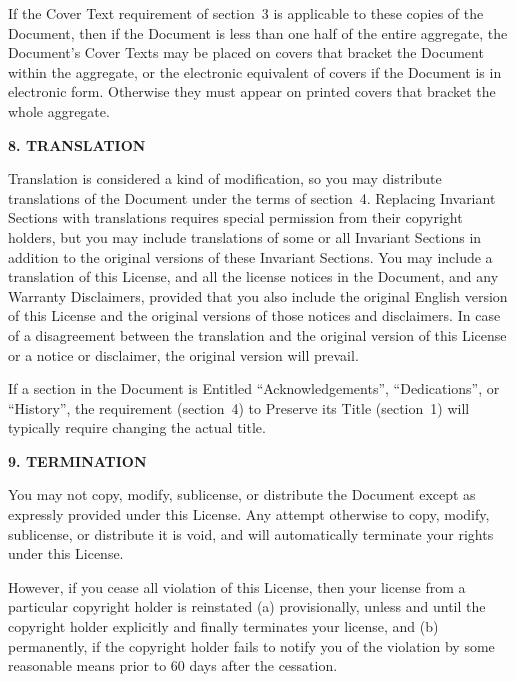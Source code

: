\documentclass[10pt,a4paper,ngerman,titlepage,tocindentauto]{article}
\begin{document}
\begin{multicols}{3}
{				If the Cover Text requirement of section~3 is applicable to these
				copies of the Document, then if the Document is less than one half of
				the entire aggregate, the Document's Cover Texts may be placed on
				covers that bracket the Document within the aggregate, or the
				electronic equivalent of covers if the Document is in electronic form.
				Otherwise they must appear on printed covers that bracket the whole
				aggregate.


				\begin{center}
				{\bf 8. TRANSLATION\par}
				\end{center}

				Translation is considered a kind of modification, so you may
				distribute translations of the Document under the terms of section~4.
				Replacing Invariant Sections with translations requires special
				permission from their copyright holders, but you may include
				translations of some or all Invariant Sections in addition to the
				original versions of these Invariant Sections.  You may include a
				translation of this License, and all the license notices in the
				Document, and any Warranty Disclaimers, provided that you also include
				the original English version of this License and the original versions
				of those notices and disclaimers.  In case of a disagreement between
				the translation and the original version of this License or a notice
				or disclaimer, the original version will prevail.

				If a section in the Document is Entitled ``Acknowledgements'',
				``Dedications'', or ``History'', the requirement (section~4) to Preserve
				its Title (section~1) will typically require changing the actual
				title.


				\begin{center}
				{\bf 9. TERMINATION\par}
				\end{center}

				You may not copy, modify, sublicense, or distribute the Document
				except as expressly provided under this License.  Any attempt
				otherwise to copy, modify, sublicense, or distribute it is void, and
				will automatically terminate your rights under this License.

				However, if you cease all violation of this License, then your license
				from a particular copyright holder is reinstated (a) provisionally,
				unless and until the copyright holder explicitly and finally
				terminates your license, and (b) permanently, if the copyright holder
				fails to notify you of the violation by some reasonable means prior to
				60 days after the cessation.

}
\end{multicols}
\end{document}
